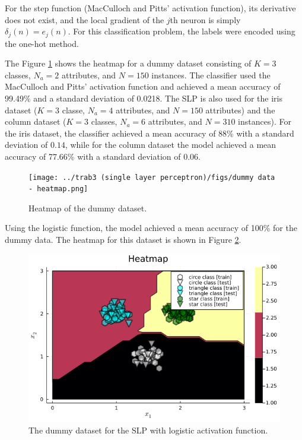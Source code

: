 \documentclass[12pt,a4paper]{article}
\begin{document}
For the step function (MacCulloch and Pitts' activation function), its derivative does not exist, and the local gradient of the \(j\)th neuron is simply \(\delta_j(n) = e_j (n)\). For this classification problem, the labels were encoded using the one-hot method.

The Figure \ref{fig:heatmap-dummy-dataset} shows the heatmap for a dummy dataset consisting of \(K=3\) classes, \(N_a=2\) attributes, and \(N=150\) instances. The classifier used the MacCulloch and Pitts' activation function and achieved a mean accuracy of 99.49\% and a standard deviation of 0.0218. The SLP is also used for the iris dataset (\(K=3\) classe, \(N_a=4\) attributes, and \(N=150\) attributes) and the column dataset (\(K=3\) classes, \(N_a=6\) attributes, and \(N=310\) instances). For the iris dataset, the classifier achieved a mean accuracy of 88\% with a standard deviation of \(0.14\), while for the column dataset the model achieved a mean accuracy of 77.66\% with a standard deviation of \(0.06\).

\begin{figure}[H]
    \centering
    \texttt{[image: ../trab3 (single layer perceptron)/figs/dummy data - heatmap.png]}
    \caption{Heatmap of the dummy dataset.}
    \label{fig:heatmap-dummy-dataset}
\end{figure}

Using the logistic function, the model achieved a mean accuracy of 100\% for the dummy data. The heatmap for this dataset is shown in Figure \ref{fig:dummy-data-heatmap}.


\begin{figure}[H]
    \centering
    \includegraphics[scale=0.4]{../trab4 (single layer perceptron with sigmoidal functions)/figs/dummy data - heatmap.png}%
    
    \caption{The dummy dataset for the SLP with logistic activation function.}
    \label{fig:dummy-data-heatmap}
\end{figure}
\end{document}
